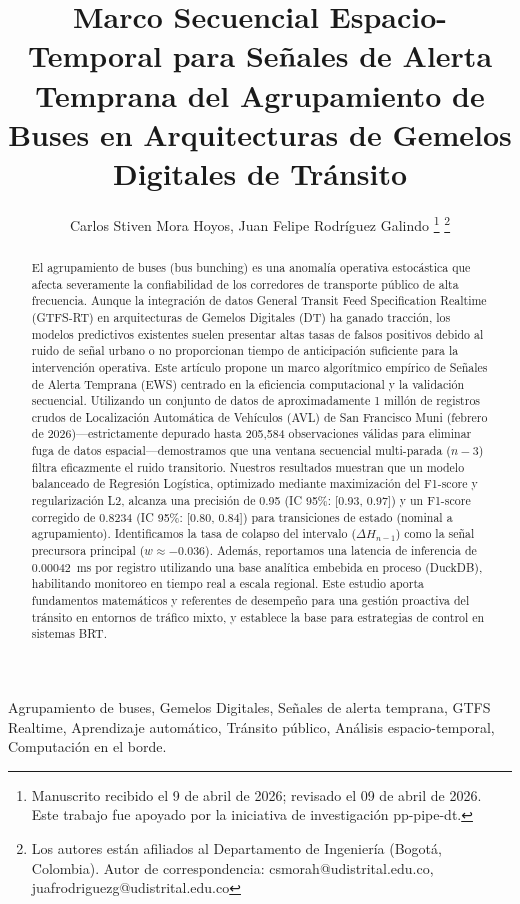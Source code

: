 \documentclass[journal,twocolumn]{IEEEtran}
\title{Marco Secuencial Espacio-Temporal para Señales de Alerta Temprana del Agrupamiento de Buses en Arquitecturas de Gemelos Digitales de Tránsito}
\author{Carlos Stiven Mora Hoyos, Juan Felipe Rodríguez Galindo
\thanks{Manuscrito recibido el 9 de abril de 2026; revisado el 09 de abril de 2026. Este trabajo fue apoyado por la iniciativa de investigación pp-pipe-dt.}
\thanks{Los autores están afiliados al Departamento de Ingeniería (Bogotá, Colombia). Autor de correspondencia: csmorah@udistrital.edu.co, juafrodriguezg@udistrital.edu.co}}
\begin{document}
\maketitle

\begin{abstract}
	El agrupamiento de buses (bus bunching) es una anomalía operativa estocástica que afecta severamente la confiabilidad de los corredores de transporte público de alta frecuencia. Aunque la integración de datos General Transit Feed Specification Realtime (GTFS-RT) en arquitecturas de Gemelos Digitales (DT) ha ganado tracción, los modelos predictivos existentes suelen presentar altas tasas de falsos positivos debido al ruido de señal urbano o no proporcionan tiempo de anticipación suficiente para la intervención operativa. Este artículo propone un marco algorítmico empírico de Señales de Alerta Temprana (EWS) centrado en la eficiencia computacional y la validación secuencial. Utilizando un conjunto de datos de aproximadamente 1 millón de registros crudos de Localización Automática de Vehículos (AVL) de San Francisco Muni (febrero de 2026)---estrictamente depurado hasta 205,584 observaciones válidas para eliminar fuga de datos espacial---demostramos que una ventana secuencial multi-parada ($n-3$) filtra eficazmente el ruido transitorio. Nuestros resultados muestran que un modelo balanceado de Regresión Logística, optimizado mediante maximización del F1-score y regularización L2, alcanza una precisión de 0.95 (IC 95\%: [0.93, 0.97]) y un F1-score corregido de 0.8234 (IC 95\%: [0.80, 0.84]) para transiciones de estado (nominal a agrupamiento). Identificamos la tasa de colapso del intervalo ($\Delta H_{n-1}$) como la señal precursora principal ($w \approx -0.036$). Además, reportamos una latencia de inferencia de \SI{0.00042}{\ms} por registro utilizando una base analítica embebida en proceso (DuckDB), habilitando monitoreo en tiempo real a escala regional. Este estudio aporta fundamentos matemáticos y referentes de desempeño para una gestión proactiva del tránsito en entornos de tráfico mixto, y establece la base para estrategias de control en sistemas BRT.
\end{abstract}

\begin{IEEEkeywords}
	Agrupamiento de buses, Gemelos Digitales, Señales de alerta temprana, GTFS Realtime, Aprendizaje automático, Tránsito público, Análisis espacio-temporal, Computación en el borde.
\end{IEEEkeywords}
\end{document}
